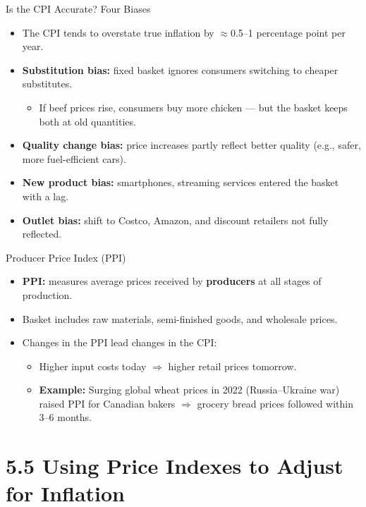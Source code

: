 \documentclass[aspectratio=169]{beamer}
\begin{document}
\begin{frame}{Is the CPI Accurate? Four Biases}
\transfade
\begin{itemize}
  \item The CPI tends to \alert{overstate} true inflation by $\approx$0.5--1 percentage point per year.
  \item \textbf{Substitution bias:} fixed basket ignores consumers switching to cheaper substitutes.
  \begin{itemize}
    \item If beef prices rise, consumers buy more chicken --- but the basket keeps both at old quantities.
  \end{itemize}
  \item \textbf{Quality change bias:} price increases partly reflect better quality (e.g., safer, more fuel-efficient cars).
  \item \textbf{New product bias:} smartphones, streaming services entered the basket with a lag.
  \item \textbf{Outlet bias:} shift to Costco, Amazon, and discount retailers not fully reflected.
\end{itemize}
\end{frame}

\begin{frame}{Producer Price Index (PPI)}
\transfade
\begin{itemize}
  \item \textbf{PPI:} measures average prices received by \textbf{producers} at all stages of production.
  \item Basket includes raw materials, semi-finished goods, and wholesale prices.
  \item Changes in the PPI \alert{lead} changes in the CPI:
  \begin{itemize}
    \item Higher input costs today $\Rightarrow$ higher retail prices tomorrow.
    \item \textbf{Example:} Surging global wheat prices in 2022 (Russia--Ukraine war) raised PPI for Canadian bakers $\Rightarrow$ grocery bread prices followed within 3--6 months.
  \end{itemize}
\end{itemize}
\end{frame}

\section{5.5 Using Price Indexes to Adjust for Inflation}
\end{document}
